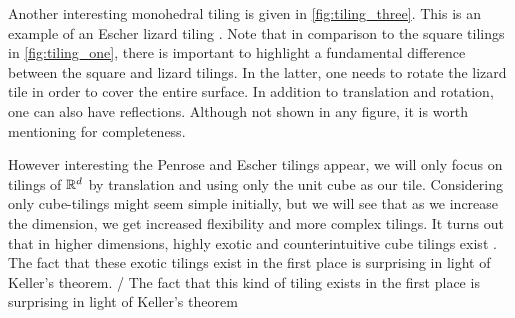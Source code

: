 \documentclass[../thesis.tex]{subfiles}
\begin{document}
Another interesting monohedral tiling is given in \cref{fig:tiling_three}. This is an example of an Escher lizard tiling \cite{kolountzakisTilingsTranslation2010}. Note that in comparison to the square tilings in \cref{fig:tiling_one}, there is important to highlight a fundamental difference between the square and lizard tilings. In the latter, one needs to rotate the lizard tile in order to cover the entire surface. In addition to translation and rotation, one can also have reflections. Although not shown in any figure, it is worth mentioning for completeness.  



However interesting the Penrose and Escher tilings appear, we will only focus on tilings of $\mathbb{R}^d$ by translation and using only the unit cube as our tile. Considering only cube-tilings might seem simple initially, but we will see that as we increase the dimension, we get increased flexibility and more complex tilings. It turns out that in higher dimensions, highly exotic and counterintuitive cube tilings exist \cite{iosevichSpectralTilingProperties1998}. The fact that these exotic tilings exist in the first place is surprising in light of Keller's theorem. / The fact that this kind of tiling exists in the first place is surprising in light of Keller's theorem \cite{iosevichSpectralTilingProperties1998}%
\end{document}
